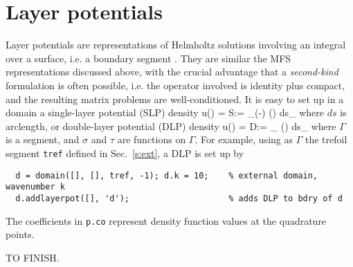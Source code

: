 \section{Layer potentials}

Layer potentials are representations of Helmholtz solutions
involving an integral over a surface, i.e. a boundary segment
\cite{coltonkress}.
They are similar the MFS representations discussed above, with the
crucial advantage that a {\em second-kind}
formulation is often possible, i.e. the operator involved is
identity plus compact, and the resulting matrix problems are well-conditioned.
It is easy to set up in a domain a single-layer potential (SLP) density
\be
u(\bx) = {\cal S}\sigma := \int_\Gamma \Phi(\bx-\by) \sigma(\by) ds_\by
\ee
where $ds$ is arclength, or double-layer potential (DLP) density
\be
u(\bx) = {\cal D}\tau := \int_\Gamma {} \tau(\by) ds_\by
\ee
where $\Gamma$ is a segment, and $\sigma$ and $\tau$ are functions on $\Gamma$.
For example, using as $\Gamma$ the
trefoil segment {\tt tref} defined in Sec.~\ref{s:ext}, a DLP is set up
by
\begin{verbatim}
  d = domain([], [], tref, -1); d.k = 10;    % external domain, wavenumber k
  d.addlayerpot([], 'd');                    % adds DLP to bdry of d
\end{verbatim}

The coefficients in {\tt p.co} represent density function values
at the quadrature points.

TO FINISH.


